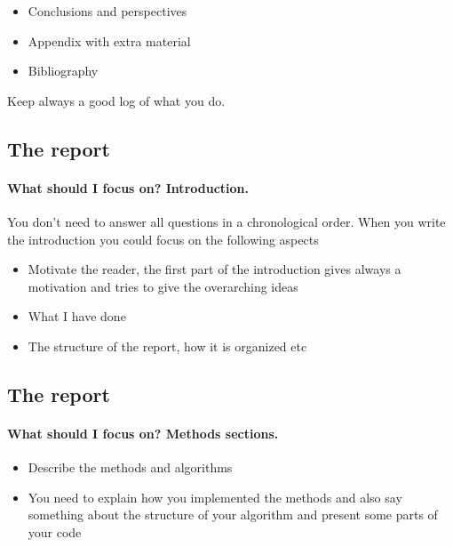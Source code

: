 \documentclass[%
oneside,                 %
final,                   %
10pt]{article}
\begin{document}
{{{{{{{{{{{{{{{\begin{itemize}
 \item Conclusions and perspectives

 \item Appendix with extra material

 \item Bibliography
\end{itemize}

\noindent
Keep always a good log of what you do.



\subsection{The report}

\paragraph{What should I focus on? Introduction.}
You don't need to answer all questions in a chronological order.  When you write the introduction you could focus on the following aspects
\begin{itemize}
 \item Motivate the reader, the first part of the introduction gives always a motivation and tries to give the overarching ideas

 \item What I have done

 \item The structure of the report, how it is organized etc
\end{itemize}

\noindent




\subsection{The report}

\paragraph{What should I focus on? Methods sections.}
\begin{itemize}
 \item Describe the methods and algorithms

 \item You need to explain how you implemented the methods and also say something about the structure of your algorithm and present some parts of your code


\end{itemize}}}}}}}}}}}}}}}}
\end{document}
